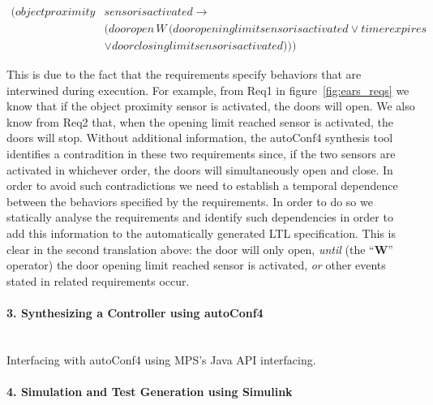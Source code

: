 \begin{align*}
[] (objectproximity&sensorisactivated \rightarrow\\
 &(dooropen\,W\,(dooropeninglimitsensorisactivated \lor timerexpires\\
 & \lor doorclosinglimitsensorisactivated )))
\end{align*}

This is due to the fact that the requirements specify behaviors that are
interwined during execution. For example, from \textsf{Req1}  in
figure~\ref{fig:ears_reqs} we know that if the \textsf{object proximity sensor}
is activated, the doors will open. We also know from \textsf{Req2} that, when
the \textsf{opening limit reached} sensor is activated, the doors will stop.
Without additional information, the \textsf{autoConf4} synthesis tool identifies
a contradition in these two requirements since, if the two sensors are activated
in whichever order, the doors will simultaneously open and close. In order to
avoid such contradictions we need to establish a temporal dependence between the
behaviors specified by the requirements. In order to do so we statically analyse
the requirements and identify such dependencies in order to add this information
to the automatically generated LTL specification.
This is clear in the second translation above: the door will only open,
\emph{until} (the ``\textbf{W}'' operator) the door \textsf{opening limit
reached} sensor is activated, \emph{or} other events stated in related
requirements occur.
 
\paragraph{3. Synthesizing a Controller using \textsf{autoConf4}\\\\}

Interfacing with \textsf{autoConf4} using MPS's Java API interfacing. 

\paragraph{4. Simulation and Test Generation using Simulink\\\\}

